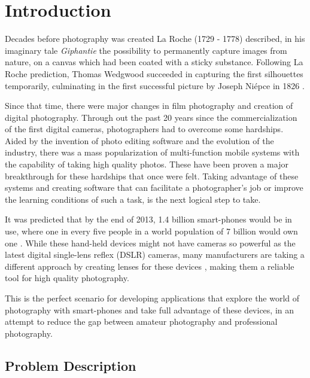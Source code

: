 % 
%  
%
\chapter{Introduction}
\label{cha:intro}

Decades before photography was created La Roche (1729 - 1778) described, in his imaginary tale \emph{Giphantie} the possibility to permanently capture images from nature, on a canvas which had been coated with a sticky substance. Following La Roche prediction, Thomas Wedgwood succeeded in capturing the first silhouettes temporarily, culminating in the first successful picture by Joseph Niépce in 1826 \cite{Leggat1995}. 

Since that time, there were major changes in film photography and creation of digital photography. Through out the past 20 years since the commercialization of the first digital cameras, photographers had to overcome some hardships.
Aided by the invention of photo editing software and the evolution of the industry, there was a mass popularization of multi-function mobile systems with the capability of taking high quality photos. These have been proven a major breakthrough for these hardships that once were felt.
Taking advantage of these systems and creating software that can facilitate a photographer's job or improve the learning conditions of such a task, is the next logical step to take.

It was predicted that by the end of 2013, 1.4 billion smart-phones would be in use, where one in every five people in a world population of 7 billion would own one \cite{Leonard2013}. While these hand-held devices might not have cameras so powerful as the latest digital single-lens reflex (DSLR) cameras, many manufacturers are taking a different approach by creating lenses for these devices \cite{Bolton2013}, making them a reliable tool for high quality photography.

This is the perfect scenario for developing applications that explore the world of photography with smart-phones and take full advantage of these devices, in an attempt to reduce the gap between amateur photography and professional photography.

\section{Problem Description}

